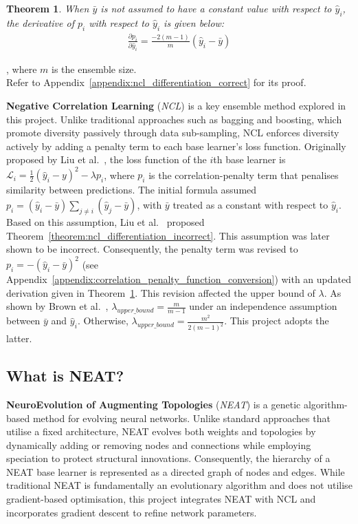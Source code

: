 \documentclass{article}
\newtheorem{theorem}{Theorem}
\begin{document}
\begin{theorem}\label{theorem:ncl_differentiation_correct}
    When $\bar{y}$ is not assumed to have a constant value with respect to $\hat{y}_i$, the derivative of $p_i$ with respect to $\hat{y}_i$ is given below: 
    \begin{align*}
        \frac{\partial{p_i}}{\partial{\hat{y}_i}} = \frac{-2 (m - 1)}{m} (\hat{y}_i - \bar{y})
    \end{align*}
\end{theorem}
, where $m$ is the ensemble size. 
\\
Refer to Appendix~\ref{appendix:ncl_differentiation_correct} for its proof. 

\textbf{Negative Correlation Learning} (\textit{NCL}) is a key ensemble method explored in this project. Unlike traditional approaches such as bagging and boosting, which promote diversity passively through data sub-sampling, NCL enforces diversity actively by adding a penalty term to each base learner's loss function. 
Originally proposed by Liu et al.\ \cite{liu1999negative}, the loss function of the $i$th base learner is $\mathcal{L}_i = \frac{1}{2} (\hat{y}_i - y)^2 - \lambda p_i$, where $p_i$ is the correlation-penalty term that penalises similarity between predictions. The initial formula assumed $p_i = (\hat{y}_i - \bar{y}) \sum_{j \neq i} (\hat{y}_j - \bar{y})$, with $\bar{y}$ treated as a constant with respect to $\hat{y}_i$. Based on this assumption, Liu et al.\ \cite{liu1999negative} proposed Theorem~\ref{theorem:ncl_differentiation_incorrect}. 
This assumption was later shown to be incorrect. Consequently, the penalty term was revised to $p_i = -(\hat{y}_i - \bar{y})^2$ (see Appendix~\ref{appendix:correlation_penalty_function_conversion}) with an updated derivation given in Theorem~\ref{theorem:ncl_differentiation_correct}. 
This revision  affected the upper bound of $\lambda$. As shown by Brown et al.\ \cite{brown2005managing}, $\lambda_{upper\_bound} = \frac{m}{m - 1}$ under an independence assumption between $\bar{y}$ and $\hat{y}_i$. Otherwise, $\lambda_{upper\_bound} = \frac{m^2}{2(m - 1)^2}$. This project adopts the latter. 


\subsection{What is NEAT? }
\label{subsec:background_neat}
\textbf{NeuroEvolution of Augmenting Topologies} (\textit{NEAT}) is a genetic algorithm-based method for evolving neural networks. Unlike standard approaches that utilise a fixed architecture, NEAT evolves both weights and topologies by dynamically adding or removing nodes and connections while employing speciation to protect structural innovations. Consequently, the hierarchy of a NEAT base learner is represented as a directed graph of nodes and edges. 
While traditional NEAT is fundamentally an evolutionary algorithm and does not utilise gradient-based optimisation, this project integrates NEAT with NCL and incorporates gradient descent to refine network parameters. 
\end{document}
